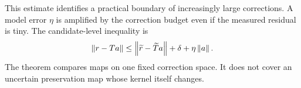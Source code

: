 This estimate identifies a practical boundary of increasingly large corrections. A model error $\eta$ is amplified by the correction budget even if the measured residual is tiny. The candidate-level inequality is
\[
 \left\lVert r-Ta\right\rVert\le\left\lVert\widetilde r-\widetilde Ta\right\rVert+\delta+\eta\left\lVert a\right\rVert.
\]
The theorem compares maps on one fixed correction space. It does not cover an uncertain preservation map whose kernel itself changes.

